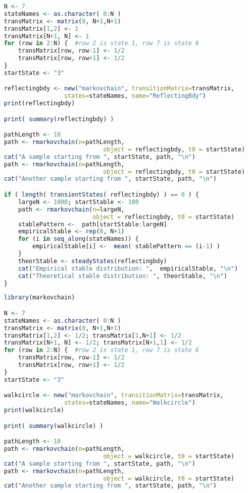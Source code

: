 \begin{description}
\begin{lstlisting}[language=R]
N <- 7
stateNames <- as.character( 0:N )
transMatrix <- matrix(0, N+1,N+1)
transMatrix[1,2] <- 1
transMatrix[N+1, N] <- 1
for (row in 2:N) {  #row 2 is state 1, row 7 is state 6
    transMatrix[row, row-1] <- 1/2
    transMatrix[row, row+1] <- 1/2
}
startState <- "3"

reflectingbdy <- new("markovchain", transitionMatrix=transMatrix,
                 states=stateNames, name="ReflectingBdy")
print(reflectingbdy)

print( summary(reflectingbdy) )

pathLength <- 10 
path <- rmarkovchain(n=pathLength,
                            object = reflectingbdy, t0 = startState)
cat("A sample starting from ", startState, path, "\n")
path <- rmarkovchain(n=pathLength,
                            object = reflectingbdy, t0 = startState)
cat("Another sample starting from ", startState, path, "\n")

if ( length( transientStates( reflectingbdy) ) == 0 ) {
    largeN <- 1000; startStable <- 100
    path <- rmarkovchain(n=largeN,
                         object = reflectingbdy, t0 = startState)
    stablePattern <-  path[startStable:largeN]
    empiricalStable <- rep(0, N+1)
    for (i in seq_along(stateNames)) { 
        empiricalStable[i] <-  mean( stablePattern == (i-1) )
    }
    theorStable <- steadyStates(reflectingbdy)
    cat("Empirical stable distribution: ",  empiricalStable, "\n")
    cat("Theoretical stable distribution: ", theorStable, "\n")
}
\end{lstlisting}


\begin{lstlisting}[language=R]
library(markovchain)

N <- 7
stateNames <- as.character( 0:N )
transMatrix <- matrix(0, N+1,N+1)
transMatrix[1,2] <- 1/2; transMatrix[1,N+1] <- 1/2
transMatrix[N+1, N] <- 1/2; transMatrix[N+1,1] <- 1/2
for (row in 2:N) {  #row 2 is state 1, row 7 is state 6
    transMatrix[row, row-1] <- 1/2
    transMatrix[row, row+1] <- 1/2
}
startState <- "3"

walkcircle <- new("markovchain", transitionMatrix=transMatrix,
                 states=stateNames, name="Walkcircle")
print(walkcircle)

print( summary(walkcircle) )

pathLength <- 10 
path <- rmarkovchain(n=pathLength,
                            object = walkcircle, t0 = startState)
cat("A sample starting from ", startState, path, "\n")
path <- rmarkovchain(n=pathLength,
                            object = walkcircle, t0 = startState)
cat("Another sample starting from ", startState, path, "\n")


\end{lstlisting}
\end{description}

